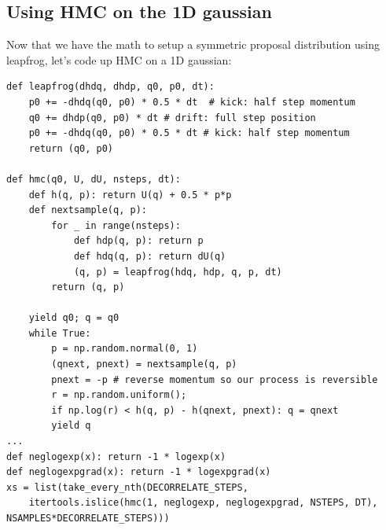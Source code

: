 \documentclass[titlepage]{article}
\newcommand{\p}{\mathbf{p}}
\newcommand{\q}{\mathbf{q}}
\begin{document}
% 
% 
% 


\subsection{Using HMC on the 1D gaussian}

Now that we have the math to setup a symmetric proposal distribution using
leapfrog, let's
code up HMC on a 1D gaussian:

{\footnotesize

\begin{verbatim}
def leapfrog(dhdq, dhdp, q0, p0, dt):
    p0 += -dhdq(q0, p0) * 0.5 * dt  # kick: half step momentum
    q0 += dhdp(q0, p0) * dt # drift: full step position
    p0 += -dhdq(q0, p0) * 0.5 * dt # kick: half step momentum
    return (q0, p0)

def hmc(q0, U, dU, nsteps, dt):
    def h(q, p): return U(q) + 0.5 * p*p
    def nextsample(q, p):
        for _ in range(nsteps):
            def hdp(q, p): return p
            def hdq(q, p): return dU(q)
            (q, p) = leapfrog(hdq, hdp, q, p, dt)
        return (q, p)

    yield q0; q = q0
    while True:
        p = np.random.normal(0, 1)
        (qnext, pnext) = nextsample(q, p)
        pnext = -p # reverse momentum so our process is reversible
        r = np.random.uniform(); 
        if np.log(r) < h(q, p) - h(qnext, pnext): q = qnext
        yield q
...
def neglogexp(x): return -1 * logexp(x)
def neglogexpgrad(x): return -1 * logexpgrad(x)
xs = list(take_every_nth(DECORRELATE_STEPS, 
    itertools.islice(hmc(1, neglogexp, neglogexpgrad, NSTEPS, DT), NSAMPLES*DECORRELATE_STEPS)))
\end{verbatim}
}
\end{document}
